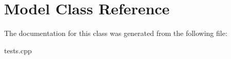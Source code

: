 \hypertarget{classModel}{\section{Model Class Reference}
\label{classModel}
}


The documentation for this class was generated from the following file\-:\begin{DoxyCompactItemize}
\item 
tests.\-cpp\end{DoxyCompactItemize}
